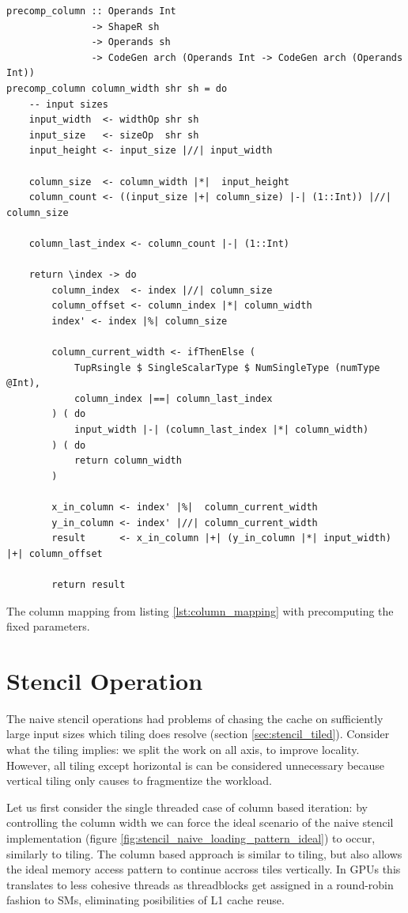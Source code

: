 \begin{listing}
    \begin{verbatim}
precomp_column :: Operands Int 
               -> ShapeR sh 
               -> Operands sh 
               -> CodeGen arch (Operands Int -> CodeGen arch (Operands Int))
precomp_column column_width shr sh = do
    -- input sizes
    input_width  <- widthOp shr sh
    input_size   <- sizeOp  shr sh
    input_height <- input_size |//| input_width
    
    column_size  <- column_width |*|  input_height
    column_count <- ((input_size |+| column_size) |-| (1::Int)) |//| column_size

    column_last_index <- column_count |-| (1::Int)

    return \index -> do
        column_index  <- index |//| column_size
        column_offset <- column_index |*| column_width
        index' <- index |%| column_size

        column_current_width <- ifThenElse (
            TupRsingle $ SingleScalarType $ NumSingleType (numType @Int), 
            column_index |==| column_last_index
        ) ( do
            input_width |-| (column_last_index |*| column_width)
        ) ( do
            return column_width
        )
        
        x_in_column <- index' |%|  column_current_width
        y_in_column <- index' |//| column_current_width
        result      <- x_in_column |+| (y_in_column |*| input_width) |+| column_offset

        return result
    \end{verbatim}
    \caption{
        The column mapping from listing \ref{lst:column_mapping} with precomputing the fixed parameters.
    }
    \label{lst:column_mapping_precompute}
\end{listing}

\section{Stencil Operation}

The naive stencil operations had problems of chasing the cache on sufficiently large input sizes which tiling does resolve (section \ref{sec:stencil_tiled}).
Consider what the tiling implies: we split the work on all axis, to improve locality.
However, all tiling except horizontal is can be considered unnecessary because vertical tiling only causes to fragmentize the workload.

Let us first consider the single threaded case of column based iteration: by controlling the column width we can force the ideal scenario of the naive stencil implementation (figure \ref{fig:stencil_naive_loading_pattern_ideal}) to occur, similarly to tiling.
The column based approach is similar to tiling, but also allows the ideal memory access pattern to continue accross tiles vertically.
In GPUs this translates to less cohesive threads as threadblocks get assigned in a round-robin fashion to SMs, eliminating posibilities of L1 cache reuse.


